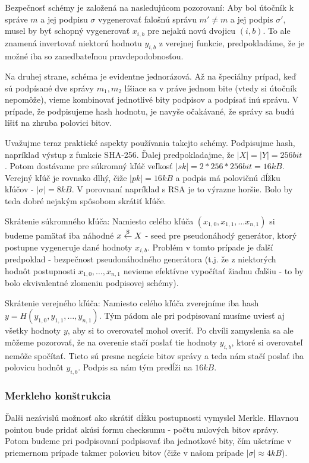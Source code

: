 Bezpečnosť schémy je založená na nasledujúcom pozorovaní:
Aby bol útočník k správe $m$ a jej podpisu $\sigma$ vygenerovať
falošnú správu $m' \ne m$ a jej podpis $\sigma'$, musel by byť schopný
vygenerovať $x_{i,b}$ pre nejakú novú dvojicu $(i,b)$.
To ale znamená invertovať niektorú hodnotu $y_{i,b}$ z verejnej
funkcie, predpokladáme, že je možné iba so zanedbateľnou
pravdepodobnosťou.

Na druhej strane, schéma je evidentne jednorázová.
Až na špeciálny prípad, keď sú podpísané dve správy $m_1,m_2$ líšiace
sa v práve jednom bite (vtedy si útočník nepomôže), vieme kombinovať
jednotlivé bity podpisov a podpísať inú správu. V prípade, že
podpisujeme hash hodnotu, je navyše očakávané, že správy sa budú líšiť
na zhruba polovici bitov.

Uvažujme teraz praktické aspekty používania takejto schémy. Podpisujme
hash, napríklad výstup z funkcie SHA-256. Ďalej predpokladajme, že
$|X|=|Y|=256 \unit{bit}$. Potom dostávame pre súkromný kľúč veľkosť
$|sk|=2*256*256 bit =16 \unit{kB}$. Verejný kľúč je rovnako dlhý, čiže
$|pk|=16 \unit{kB}$ a podpis má polovičnú dĺžku kľúčov - $|\sigma|=8
\unit{kB}$.
V porovnaní napríklad s RSA je to výrazne horšie. Bolo by teda dobré
nejakým spôsobom skrátiť kľúče.

Skrátenie súkromného kľúča: Namiesto celého kľúča $(x_{1,0}, x_{1,1},
\ldots x_{n,1})$ si budeme pamätať iba náhodné $x \overset{\$}{\leftarrow} X$ - seed pre
pseudonáhodý generátor, ktorý postupne vygeneruje dané hodnoty
$x_{i,b}$. Problém v tomto prípade je ďalší predpoklad - bezpečnost
pseudonáhodného generátora (t.j. že z niektorých hodnôt postupnosti
$x_{1,0}, \ldots, x_{n,1}$ nevieme efektívne vypočítať žiadnu ďalšiu -
to by bolo ekvivalentné zlomeniu podpisovej schémy).

Skrátenie verejného kľúča: Namiesto celého kľúča zverejníme iba hash
$y=H(y_{1,0},y_{1,1},\ldots,y_{n,1})$. Tým pádom ale pri podpisovaní
musíme uviesť aj všetky hodnoty $y$, aby si to overovateľ mohol
overiť. Po chvíli zamyslenia sa ale môžeme pozorovať, že na overenie
stačí poslať tie hodnoty $y_{i,b}$, ktoré si overovateľ nemôže
spočítať. Tieto sú presne negácie bitov správy a teda nám stačí poslať
iba polovicu hodnôt $y_{i,b}$. Podpis sa nám tým predĺži na $16
\unit{kB}$.

\subsubsection{Merkleho konštrukcia}
Ďalši nezávislú možnosť ako skrátiť dĺžku postupnosti vymyslel
Merkle. Hlavnou pointou bude pridať akúsi formu checksumu - počtu
nulových bitov správy. Potom budeme pri podpisovaní podpisovať iba
jednotkové bity, čím ušetríme v priemernom prípade takmer polovicu bitov
(čiže v našom prípade $|\sigma| \approx 4 \unit{kB}$).

